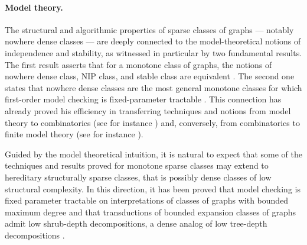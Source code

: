 \paragraph*{Model theory.}
The  structural and algorithmic properties of sparse classes of graphs --- notably nowhere dense classes --- are deeply connected to  the model-theoretical notions of independence and stability, as witnessed in particular by two fundamental results. The first result asserts that for a monotone class of graphs, the notions of nowhere dense class, NIP class, and stable class are equivalent \cite{adler2014interpreting}. The second one states that nowhere dense classes are the most general monotone classes for which first-order model checking is fixed-parameter tractable \cite{grohe2017deciding}. This connection has already proved his efficiency in transferring techniques and notions from model theory to combinatorics (see for instance \cite{pilipczuk2018number}) and, conversely, from combinatorics to finite model theory (see for instance \cite{rossman2008homomorphism}).

Guided by the model theoretical intuition, it is natural to expect that some of the techniques and results proved for monotone sparse classes may extend to hereditary structurally sparse classes, that is possibly dense classes of low structural complexity. In this direction, it has been proved that model checking is fixed parameter tractable on interpretations of classes of graphs with bounded maximum degree \cite{gajarsky2016new} and that transductions of bounded expansion classes of graphs admit low shrub-depth decompositions, a dense analog of low tree-depth decompositions \cite{gajarsky2018first}. 